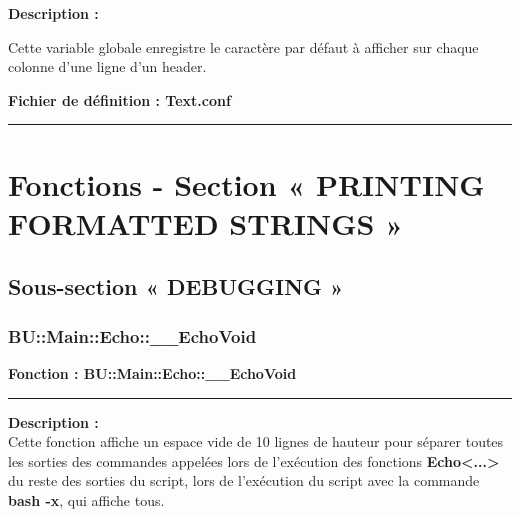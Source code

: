 \documentclass[a4paper,10pt]{article}
\begin{document}
\begin{justify}\setlength{\parskip}{2em}
    \textbf{Description :}
\end{justify}\setlength{\parskip}{1em}

\begin{justify}
    Cette variable globale enregistre le caractère par défaut à afficher sur chaque colonne d'une ligne d'un header.
\end{justify}

\textbf{Fichier de définition : \color{lime}Text.conf}\\[1\baselineskip]





\color{red}\par\noindent\rule{\textwidth}{0.4pt}\color{white}

\color{red}
\section{Fonctions - Section « PRINTING FORMATTED STRINGS »}\color{white}

\color{green}
\subsection{Sous-section « DEBUGGING »}\color{white}

\color{blue}
\subsubsection{BU::Main::Echo::\_\_EchoVoid}\color{white}

\textbf{Fonction : \color{mauve}BU::Main::Echo::\_\_EchoVoid}\setlength{\parskip}{1em}


\par\noindent\rule{\textwidth}{0.4pt}

\begin{justify}
    \textbf{Description :}\\[1\baselineskip]
    Cette fonction affiche un espace vide de 10 lignes de hauteur pour séparer toutes les sorties des commandes appelées lors de l'exécution des fonctions \textbf{\color{mauve}Echo<...>} du reste des sorties du script, lors de l'exécution du script avec la commande \textbf{\color{gray}bash -x}, qui affiche tous.
\end{justify}
\end{document}
